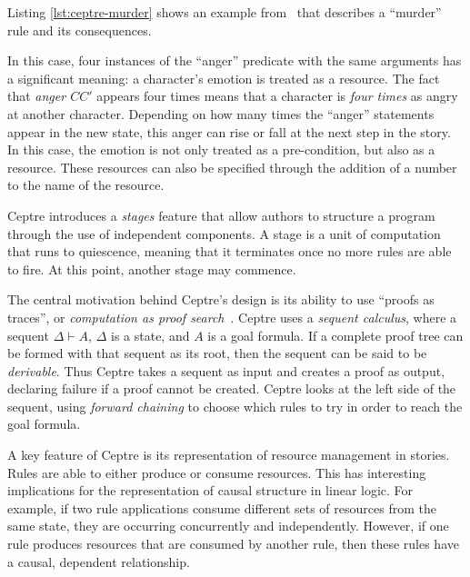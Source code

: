 Listing \ref{lst:ceptre-murder} shows an example from~\cite{martens2015ceptre}
that describes a ``murder'' rule and its consequences.



In this case, four instances of the ``anger'' predicate with the same arguments
has a significant meaning: a character's emotion is treated as a resource. The
fact that \emph{anger $C C'$} appears four times means that a character is
\emph{four times} as angry at another character. Depending on how many times the
``anger'' statements appear in the new state, this anger can rise or fall at the
next step in the story. In this case, the emotion is not only treated as a
pre-condition, but also as a resource. These resources can also be specified
through the addition of a number to the name of the resource.

Ceptre introduces a \emph{stages} feature that allow authors to structure a
program through the use of independent components. A stage is a unit of
computation that runs to quiescence, meaning that it terminates once no more
rules are able to fire. At this point, another stage may commence.

The central motivation behind Ceptre's design is its ability to use ``proofs as
traces'', or \emph{computation as proof search}~\cite{hodas1991logic}. Ceptre
uses a \emph{sequent calculus}, where a sequent $\Delta \vdash A$, $\Delta$ is a
state, and $A$ is a goal formula. If a complete proof tree can be formed with
that sequent as its root, then the sequent can be said to be \emph{derivable}.
Thus Ceptre takes a sequent as input and creates a proof as output, declaring
failure if a proof cannot be created. Ceptre looks at the left side of the
sequent, using \emph{forward chaining} to choose which rules to try in order to
reach the goal formula.

A key feature of Ceptre is its representation of resource management in stories.
Rules are able to either produce or consume resources. This has interesting
implications for the representation of causal structure in linear logic. For
example, if two rule applications consume different sets of resources from the
same state, they are occurring concurrently and independently. However, if one
rule produces resources that are consumed by another rule, then these rules have
a causal, dependent relationship.

